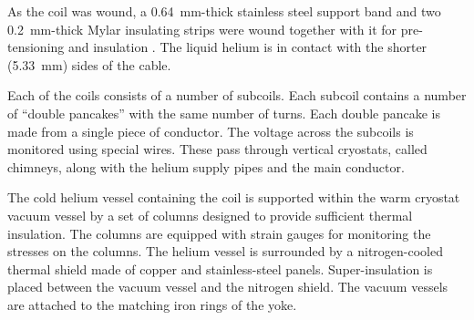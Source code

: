 As the coil was wound, a 0.64~mm-thick stainless steel support band
and two 0.2~mm-thick Mylar insulating strips were wound together with it
for pre-tensioning and insulation%
. 
The liquid helium is in contact with the shorter (5.33~mm) sides of
the cable.

Each of the coils consists of a number of subcoils. Each subcoil
contains a number of ``double pancakes'' with the same number of
turns.
Each double pancake is made from a single piece of conductor. The
voltage across the subcoils is monitored using special wires. These pass
through vertical cryostats, called chimneys, along with the helium supply pipes and the
main conductor.

The cold helium vessel containing the coil is supported within the
warm cryostat vacuum vessel by a set of columns designed to provide
sufficient thermal insulation. The columns are equipped with strain
gauges for monitoring the stresses on the columns. The helium vessel
is surrounded by a nitrogen-cooled thermal shield made of copper and stainless-steel panels.
Super-insulation is placed between the vacuum vessel and the nitrogen
shield.  The vacuum vessels are attached to the matching iron rings of
the yoke.

